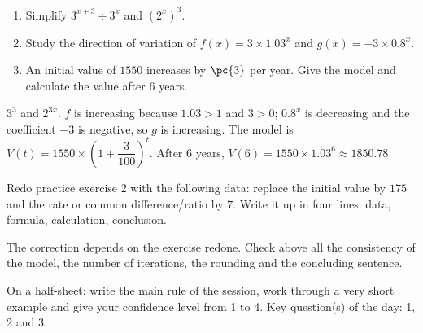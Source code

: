 \begin{exercise}[essential]
\begin{enumerate}\item Simplify $3^{x+3}\div3^x$ and $(2^x)^3$.\item Study the direction of variation of $f(x)=3\times\num{1,03}^x$ and $g(x)=-3\times\num{0,8}^x$.\item An initial value of $1550$ increases by $\pc{3}$ per year. Give the model and calculate the value after $6$ years.\end{enumerate}
\end{exercise}
\begin{solution}$3^3$ and $2^{3x}$. $f$ is increasing because $\num{1,03}>1$ and $3>0$; $\num{0,8}^x$ is decreasing and the coefficient $-3$ is negative, so $g$ is increasing. The model is $V(t)=1550\times\left(1+\dfrac{3}{100}\right)^t$. After $6$ years, $V(6)=1550\times\num{1,03}^6\approx\num{1850,78}$.\end{solution}


\begin{homework}Redo practice exercise 2 with the following data: replace the initial value by $175$ and the rate or common difference/ratio by $7$. Write it up in four lines: data, formula, calculation, conclusion.\end{homework}
\begin{solution}The correction depends on the exercise redone. Check above all the consistency of the model, the number of iterations, the rounding and the concluding sentence.\end{solution}

\begin{exitticket}[3 minutes]On a half-sheet: write the main rule of the session, work through a very short example and give your confidence level from 1 to 4. Key question(s) of the day: 1, 2 and 3.\end{exitticket}

